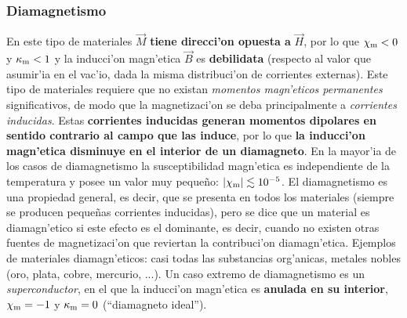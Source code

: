 \subsubsection{Diamagnetismo}
En este tipo de materiales $\vec{M}$ \textbf{tiene direcci'on opuesta a}  $\vec{H}$, por lo que $\chi_{\rm m}<0$ y $\kappa_{\rm m}<1$ y la inducci'on magn'etica $\vec{B}$ es \textbf{debilidata} (respecto al valor que asumir'ia en el vac'io, dada la misma distribuci'on de corrientes externas). Este tipo de materiales requiere que no existan \textit{momentos magn'eticos permanentes} significativos, de modo que la magnetizaci'on se deba principalmente a \textit{corrientes inducidas}. Estas \textbf{corrientes inducidas generan momentos dipolares en sentido contrario al campo que las induce}, por lo que \textbf{la inducci'on magn'etica disminuye en el interior de un diamagneto}. En la mayor'ia de los casos de diamagnetismo la susceptibilidad magn'etica es independiente de la
temperatura y posee un valor muy peque\~no: $|\chi_{\rm m}|\lesssim 10^{-5}$. El
diamagnetismo es una propiedad general, es decir, que se presenta en todos los
materiales (siempre se producen peque\~nas corrientes inducidas), pero se dice
que un material es diamagn'etico si este efecto es el dominante, es decir,
cuando no existen otras fuentes de magnetizaci'on que reviertan la contribuci'on diamagn'etica.
Ejemplos de materiales diamagn'eticos: casi todas las substancias org'anicas,
metales nobles (oro, plata, cobre, mercurio, ...). Un caso extremo de
diamagnetismo es un \textit{superconductor}, en el que la inducci'on magn'etica
es \textbf{anulada en su interior}, $\chi_{\rm m}=-1$ y $\kappa_{\rm m}=0$ (``diamagneto ideal'').

